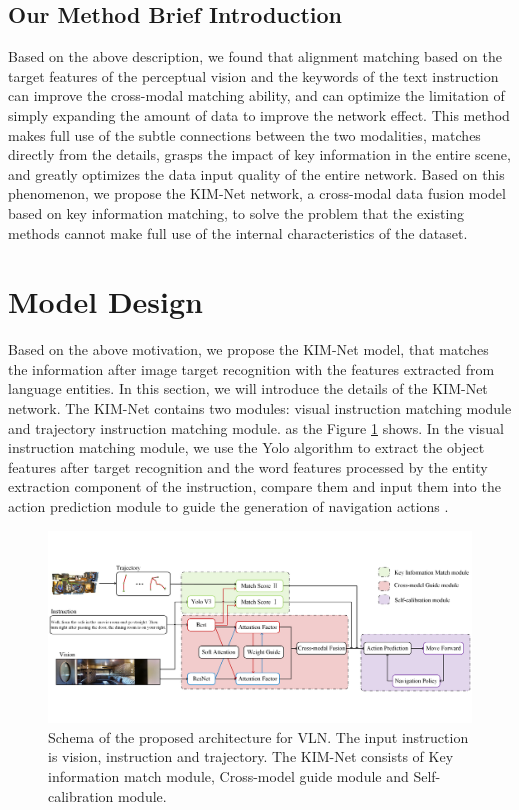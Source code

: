 \subsection{Our Method Brief Introduction}

Based on the above description, we found that alignment matching based on the target features of the perceptual vision and the keywords of the text instruction can improve the cross-modal matching ability, and can optimize the limitation of simply expanding the amount of data to improve the network effect. This method makes full use of the subtle connections between the two modalities, matches directly from the details, grasps the impact of key information in the entire scene, and greatly optimizes the data input quality of the entire network. Based on this phenomenon, we propose the KIM-Net network, a cross-modal data fusion model based on key information matching, to solve the problem that the existing methods cannot make full use of the internal characteristics of the dataset.

\section{Model Design}
	
Based on the above motivation, we propose the KIM-Net model, that matches the information after image target recognition with the features extracted from language entities. In this section, we will introduce the details of the KIM-Net network. The KIM-Net contains two modules: visual instruction matching module and trajectory instruction matching module. as the Figure \ref{image03} shows. In the visual instruction matching module, we use the Yolo algorithm to extract the object features after target recognition and the word features processed by the entity extraction component of the instruction, compare them and input them into the action prediction module to guide the generation of navigation actions \cite{redmon2016you}.
\vspace{-2em}
\begin{figure}[h]
	\centering
	\includegraphics[scale=1]{image03.png}
	\caption{Schema of the proposed architecture for VLN. The input instruction is vision, instruction and trajectory. The KIM-Net consists of Key information match module, Cross-model guide module and Self-calibration module.}
	\label{image03}
\end{figure}

